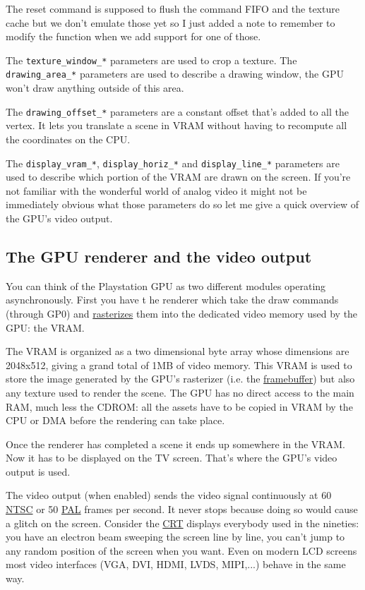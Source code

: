 \documentclass[a4paper]{article}
\newcommand{\code}[1] {\texttt{#1}}
\begin{document}
The reset command is supposed to flush the command FIFO and the
texture cache but we don't emulate those yet so I just added a note to
remember to modify the function when we add support for one of those.

The \code{texture\_window\_*} parameters are used to crop a texture. The
\code{drawing\_area\_*} parameters are used to describe a drawing window, the
GPU won't draw anything outside of this area.

The \code{drawing\_offset\_*} parameters are a constant offset that's
added to all the vertex. It lets you translate a scene in VRAM without
having to recompute all the coordinates on the CPU.

The \code{display\_vram\_*}, \code{display\_horiz\_*} and
\code{display\_line\_*} parameters are used to describe which portion
of the VRAM are drawn on the screen. If you're not familiar with the
wonderful world of analog video it might not be immediately obvious
what those parameters do so let me give a quick overview of the GPU's
video output.

\subsection{The GPU renderer and the video output}

You can think of the Playstation GPU as two different modules
operating asynchronously. First you have t he renderer which take the
draw commands (through GP0) and
\href{https://en.wikipedia.org/wiki/Rasterisation}{rasterizes} them
into the dedicated video memory used by the GPU: the VRAM.

The VRAM is organized as a two dimensional byte array whose dimensions
are 2048x512, giving a grand total of 1MB of video memory. This VRAM
is used to store the image generated by the GPU's rasterizer (i.e. the
\href{https://en.wikipedia.org/wiki/Framebuffer}{framebuffer}) but
also any texture used to render the scene. The GPU has no direct
access to the main RAM, much less the CDROM: all the assets have to be
copied in VRAM by the CPU or DMA before the rendering can take place.

Once the renderer has completed a scene it ends up somewhere in the
VRAM. Now it has to be displayed on the TV screen. That's where the
GPU's video output is used.

The video output (when enabled) sends the video signal continuously at
60 \href{https://en.wikipedia.org/wiki/NTSC}{NTSC} or 50
\href{https://en.wikipedia.org/wiki/PAL}{PAL} frames per second. It
never stops because doing so would cause a glitch on the
screen. Consider the
\href{https://en.wikipedia.org/wiki/Cathode_ray_tube}{CRT} displays
everybody used in the nineties: you have an electron beam sweeping the
screen line by line, you can't jump to any random position of the
screen when you want. Even on modern LCD screens most video interfaces
(VGA, DVI, HDMI, LVDS, MIPI,...) behave in the same way.
\end{document}
